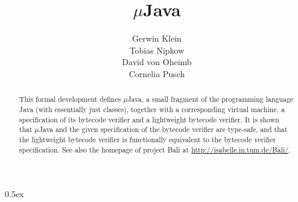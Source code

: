 \documentclass[11pt,a4paper]{article}
\newcommand{\mJava}{$\mu$Java}
\begin{document}
\title{\mJava}
\author{Gerwin Klein \\ Tobias Nipkow \\ David von Oheimb \\ Cornelia Pusch}
\maketitle

\begin{abstract}\noindent
  This formal development defines {\mJava}, a small fragment of the
  programming language Java (with essentially just classes), together with a
  corresponding virtual machine, a specification of its bytecode verifier
  and a lightweight bytecode verifier.
  It is shown that {\mJava} and the given specification of the bytecode
  verifier are type-safe, and that the lightweight bytecode verifier
  is functionally equivalent to the bytecode verifier specification.
  See also the homepage of project Bali at \url{http://isabelle.in.tum.de/Bali/}.
\end{abstract}

\tableofcontents
\parindent 0pt \parskip 0.5ex

\newpage


\newpage
\nocite{*}


\end{document}
